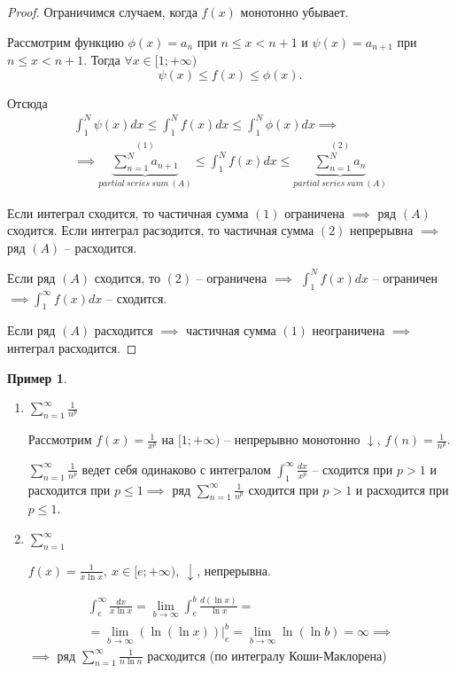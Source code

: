 \documentclass{report}
\theoremstyle{definition}
\newtheorem{example}{Пример}
\begin{document}
\begin{proof}
  Ограничимся случаем, когда $f(x)$ монотонно убывает.

  Рассмотрим функцию $\phi(x) = a_n$ при $n \leqslant x < n+1$ и $\psi(x) = a_{n+1}$ при $n\leqslant x <n + 1$. Тогда $\forall x \in [1;+\infty)$
  \begin{equation*}
    \psi(x) \leqslant f(x) \leqslant\phi(x).
  \end{equation*}

  Отсюда
  \begin{multline*}
    \int_{1}^{N}\psi(x)dx \leqslant \int_{1}^{N}f(x)dx \leqslant\int_{1}^{N}\phi(x)dx \implies \\
    \implies \underbrace{\sum_{n=1}^{N}a_{n+1}}_{partial \ series \ sum \ (A)}^{(1)} \leqslant \int_{1}^{N}f(x)dx \leqslant \underbrace{\sum_{n=1}^{N}a_n}_{partial \ series \ sum \ (A)}^{(2)}
  \end{multline*}

  Если интеграл сходится, то частичная сумма $(1)$ ограничена $\implies$ ряд $(A)$ сходится. Если интеграл расзодится, то частичная сумма $(2)$ непрерывна $\implies$ ряд $(A)$ -- расходится.

  Если ряд $(A)$ сходится, то $(2)$ -- ограничена $\implies$ $\int_{1}^{N}f(x)dx$ -- ограничен $\implies \int_{1}^{\infty}f(x)dx$ -- сходится.

  Если ряд $(A)$ расходится $\implies$ частичная сумма $(1)$ неограничена $\implies$ интеграл расходится.
\end{proof}

\begin{example}
  \begin{enumerate}
    \item $\sum_{n=1}^{\infty}\frac{1}{n^p}$

          Рассмотрим $f(x) = \frac{1}{x^p}$ на $[1;+\infty)$ -- непрерывно монотонно $\downarrow$, $f(n) = \frac{1}{n^p}$.

          $\sum_{n=1}^{\infty}\frac{1}{n^p}$ ведет себя одинаково с интегралом $\int_{1}^{\infty}\frac{dx}{x^p}$ -- сходится при $p>1$ и расходится при $p\leqslant1 \implies$ ряд $\sum_{n=1}^{\infty}\frac{1}{n^p}$ сходится при $p>1$ и расходится при $p\leqslant1$.

    \item $\sum_{n=1}^{\infty}$

          $f(x) = \frac{1}{x\ln x}, \ x \in [e;+\infty), \ \downarrow$, непрерывна.

          \begin{multline*}
            \int_{e}^{\infty}\frac{dx}{x\ln x} = \underset{b\rightarrow\infty}{\lim}\int_{e}^{b}\frac{d(\ln x)}{\ln x} =\\
            = \underset{b\rightarrow\infty}{\lim}(\ln(\ln x))\big|_e^b = \underset{b\rightarrow\infty}{\lim}\ln (\ln b) = \infty \implies
          \end{multline*}
          $\implies$ ряд $\sum_{n=1}^{\infty}\frac{1}{n\ln n}$ расходится (по интегралу Коши-Маклорена)
  \end{enumerate}
\end{example}
\end{document}
